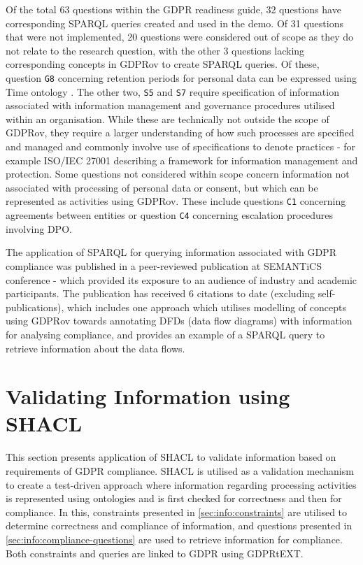 Of the total 63 questions within the GDPR readiness guide, 32 questions have corresponding SPARQL queries created and used in the demo.
Of 31 questions that were not implemented, 20 questions were considered out of scope as they do not relate to the research question, with the other 3 questions lacking corresponding concepts in GDPRov to create SPARQL queries.
Of these, question \texttt{G8} concerning retention periods for personal data can be expressed using Time ontology \cite{cox_time_2017}.
The other two, \texttt{S5} and \texttt{S7} require specification of information associated with information management and governance procedures utilised within an organisation. While these are technically not outside the scope of GDPRov, they require a larger understanding of how such processes are specified and managed and commonly involve use of specifications to denote practices - for example ISO/IEC 27001 describing a framework for information management and protection.
Some questions not considered within scope concern information not associated with processing of personal data or consent, but which can be represented as activities using GDPRov. These include questions \texttt{C1} concerning agreements between entities or question \texttt{C4} concerning escalation procedures involving DPO.

The application of SPARQL for querying information associated with GDPR compliance was published in a peer-reviewed publication \cite{pandit_queryable_2018} at SEMANTiCS conference - which provided its exposure to an audience of industry and academic participants. The publication has received 6 citations to date (excluding self-publications), which includes one approach \cite{debruyneOntologyRepresentingAnnotating2019} which utilises modelling of concepts using GDPRov towards annotating DFDs (data flow diagrams) with information for analysing compliance, and provides an example of a SPARQL query to retrieve information about the data flows.


\section{Validating Information using SHACL}\label{sec:testing:shacl}
This section presents application of SHACL to validate information based on requirements of GDPR compliance.
SHACL is utilised as a validation mechanism to create a test-driven approach where information regarding processing activities is represented using ontologies and is first checked for correctness and then for compliance.
In this, constraints presented in \autoref{sec:info:constraints} are utilised to determine correctness and compliance of information, and questions presented in \autoref{sec:info:compliance-questions} are used to retrieve information for compliance.
Both constraints and queries are linked to GDPR using GDPRtEXT.


